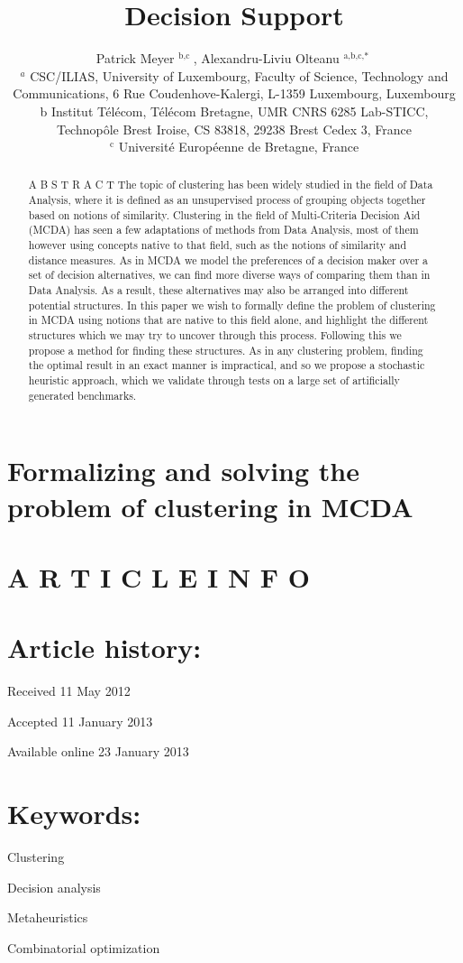 \documentclass[10pt]{article}
\title{Decision Support }
\author{Patrick Meyer ${ }^{\text {b,c }}$, Alexandru-Liviu Olteanu ${ }^{\text {a,b,c,* }}$\\
${ }^{a}$ CSC/ILIAS, University of Luxembourg, Faculty of Science, Technology and Communications, 6 Rue Coudenhove-Kalergi, L-1359 Luxembourg, Luxembourg\\
b Institut Télécom, Télécom Bretagne, UMR CNRS 6285 Lab-STICC, Technopôle Brest Iroise, CS 83818, 29238 Brest Cedex 3, France\\
${ }^{\mathrm{c}}$ Université Européenne de Bretagne, France}
\date{}
\begin{document}
\maketitle
\section*{Formalizing and solving the problem of clustering in MCDA}


\section*{A R T I C L E I N F O}
\section*{Article history:}
Received 11 May 2012

Accepted 11 January 2013

Available online 23 January 2013

\section*{Keywords:}
Clustering

Decision analysis

Metaheuristics

Combinatorial optimization

\begin{abstract}
A B S T R A C T The topic of clustering has been widely studied in the field of Data Analysis, where it is defined as an unsupervised process of grouping objects together based on notions of similarity. Clustering in the field of Multi-Criteria Decision Aid (MCDA) has seen a few adaptations of methods from Data Analysis, most of them however using concepts native to that field, such as the notions of similarity and distance measures. As in MCDA we model the preferences of a decision maker over a set of decision alternatives, we can find more diverse ways of comparing them than in Data Analysis. As a result, these alternatives may also be arranged into different potential structures. In this paper we wish to formally define the problem of clustering in MCDA using notions that are native to this field alone, and highlight the different structures which we may try to uncover through this process. Following this we propose a method for finding these structures. As in any clustering problem, finding the optimal result in an exact manner is impractical, and so we propose a stochastic heuristic approach, which we validate through tests on a large set of artificially generated benchmarks.
\end{abstract}
\end{document}
